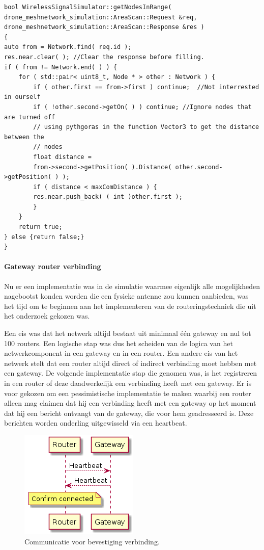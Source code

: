 \documentclass[a4paper, 11pt, oneside]{report}
\begin{document}
\begin{lstlisting}
bool WirelessSignalSimulator::getNodesInRange(
drone_meshnetwork_simulation::AreaScan::Request &req,
drone_meshnetwork_simulation::AreaScan::Response &res )
{   
auto from = Network.find( req.id );
res.near.clear( ); //Clear the response before filling.
if ( from != Network.end( ) ) {
	for ( std::pair< uint8_t, Node * > other : Network ) {
		if ( other.first == from->first ) continue;  //Not interrested in ourself
		if ( !other.second->getOn( ) ) continue; //Ignore nodes that are turned off
		// using pythgoras in the function Vector3 to get the distance between the
		// nodes
		float distance =
		from->second->getPosition( ).Distance( other.second->getPosition( ) );
		if ( distance < maxComDistance ) {
		res.near.push_back( ( int )other.first );
		}
	}	
	return true;
} else {return false;}
}
\end{lstlisting} 
 
\paragraph{Gateway router verbinding}
Nu er een implementatie was in de simulatie waarmee eigenlijk alle mogelijkheden nagebootst konden worden die een fysieke antenne zou kunnen aanbieden, was het tijd om te beginnen aan het implementeren van de routeringstechniek die uit het onderzoek gekozen was.

Een eis was dat het netwerk altijd bestaat uit minimaal één gateway en nul tot 100 routers.
Een logische stap was dus het scheiden van de logica van het netwerkcomponent in een gateway en in een router.
Een andere eis van het netwerk stelt dat een router altijd direct of indirect verbinding moet hebben met een gateway.
De volgende implementatie stap die genomen was, is het registreren in een router of deze daadwerkelijk een verbinding heeft met een gateway.
Er is voor gekozen om een pessimistische implementatie te maken waarbij een router alleen mag claimen dat hij een verbinding heeft met een gateway op het moment dat hij een bericht ontvangt van de gateway, die voor hem geadresseerd is.
Deze berichten worden onderling uitgewisseld via een heartbeat. 

\begin{figure}[H]
	\begin{center}\includegraphics[width=0.2\linewidth]{Afbeeldingen/heartbeat.png}\end{center}
	\caption{Communicatie voor bevestiging verbinding.}
	\label{fig:bevestigingverbinding}
\end{figure}
\end{document}
